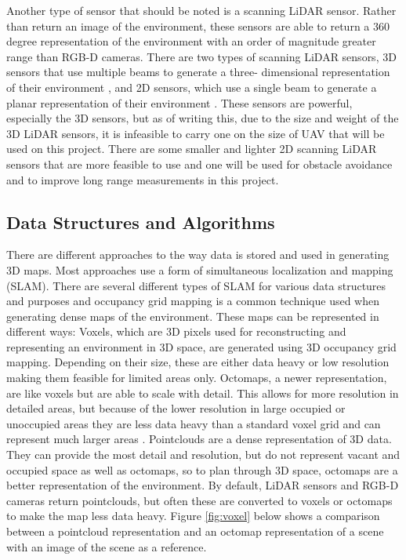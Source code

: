 \documentclass[12pt, letterpaper]{article}
\begin{document}
Another type of sensor that should be noted is a scanning LiDAR sensor. Rather than return an image of the environment, these sensors are able to return a 360 degree representation of the environment with an order of magnitude greater range than RGB-D cameras. There are two types of scanning LiDAR sensors, 3D sensors that use multiple beams to generate a three- dimensional representation of their environment \cite{Velodyne}, and 2D sensors, which use a single beam to generate a planar representation of their environment \cite{Slamtec}. These sensors are powerful, especially the 3D sensors, but as of writing this, due to the size and weight of the 3D LiDAR sensors, it is infeasible to carry one on the size of UAV that will be used on this project. There are some smaller and lighter 2D scanning LiDAR sensors that are more feasible to use and one will be used for obstacle avoidance and to improve long range measurements in this project.
 
\subsection{Data Structures and Algorithms} 
There are different approaches to the way data is stored and used in generating 3D maps. Most approaches use a form of simultaneous localization and mapping (SLAM). There are several different types of SLAM for various data structures and purposes and occupancy grid mapping is a common technique used when generating dense maps of the environment. These maps can be represented in different ways:
Voxels, which are 3D pixels used for reconstructing and representing an environment in 3D space, are generated using 3D occupancy grid mapping. Depending on their size, these are either data heavy or low resolution making them feasible for limited areas only.
Octomaps, a newer representation, are like voxels but are able to scale with detail. This allows for more resolution in detailed areas, but because of the lower resolution in large occupied or unoccupied areas they are less data heavy than a standard voxel grid and can represent much larger areas \cite{Hornung2013}.
Pointclouds are a dense representation of 3D data. They can provide the most detail and resolution, but do not represent vacant and occupied space as well as octomaps, so to plan through 3D space, octomaps are a better representation of the environment. By default, LiDAR sensors and RGB-D cameras return pointclouds, but often these are converted to voxels or octomaps to make the map less data heavy.
Figure \ref{fig:voxel} below shows a comparison between a pointcloud representation and an octomap representation of a scene with an image of the scene as a reference.
\end{document}
